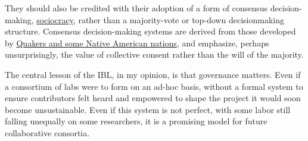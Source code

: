 \documentclass[10pt]{tufte-book}
\begin{document}
They should also be credited with their adoption of a form of consensus
decision-making, \href{https://sociocracy.info}{sociocracy}, rather than
a majority-vote or top-down decisionmaking structure. Consensus
decision-making systems are derived from those developed by
\href{https://rhizomenetwork.wordpress.com/2011/06/18/a-brief-history-of-consenus-decision-making/}{Quakers
and some Native American nations}, and emphasize, perhaps
unsurprisingly, the value of collective consent rather than the will of
the majority.

The central lesson of the IBL, in my opinion, is that governance
matters. Even if a consortium of labs were to form on an ad-hoc basis,
without a formal system to ensure contributors felt heard and empowered
to shape the project it would soon become unsustainable. Even if this
system is not perfect, with some labor still falling unequally on some
researchers, it is a promising model for future collaborative consortia.
\end{document}
